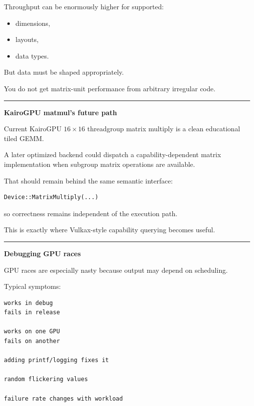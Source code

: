 Throughput can be enormously higher for supported:

\begin{itemize}
\tightlist
\item
  dimensions,
\item
  layouts,
\item
  data types.
\end{itemize}

But data must be shaped appropriately.

You do not get matrix-unit performance from arbitrary irregular code.

\begin{center}\rule{0.5\linewidth}{0.5pt}\end{center}

\textbf{KairoGPU matmul's future path}

Current KairoGPU \(16\times16\) threadgroup matrix multiply is a clean educational tiled GEMM.

A later optimized backend could dispatch a capability-dependent matrix implementation when subgroup matrix operations are available.

That should remain behind the same semantic interface:

\protect{}\label{p10-matmul-interface}%
\begin{verbatim}
Device::MatrixMultiply(...)
\end{verbatim}

so correctness remains independent of the execution path.

This is exactly where Vulkax-style capability querying becomes useful.

\begin{center}\rule{0.5\linewidth}{0.5pt}\end{center}

\textbf{Debugging GPU races}

GPU races are especially nasty because output may depend on scheduling.

Typical symptoms:

\protect{}\label{p10-race-symptoms}%
\begin{verbatim}
works in debug
fails in release

works on one GPU
fails on another

adding printf/logging fixes it

random flickering values

failure rate changes with workload
\end{verbatim}

